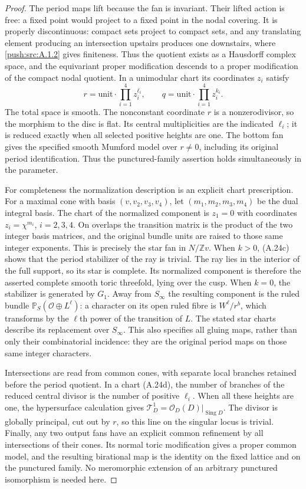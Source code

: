 \begin{proof}
The period maps lift because the fan is invariant. Their
lifted action is free: a fixed point would project to a fixed
point in the nodal covering. It is properly discontinuous:
compact sets project to compact sets, and any translating
element producing an intersection upstairs produces one
downstairs, where \ref{push:src:A.1.2} gives finiteness. Thus the quotient
exists as a Hausdorff complex space, and the equivariant
proper modification descends to a proper modification of
the compact nodal quotient. In a unimodular chart its
coordinates $z_i$ satisfy
\[
 r=\text{unit}\cdot\prod_{i=1}^4 z_i^{\ell_i},
 \qquad q=\text{unit}\cdot\prod_{i=1}^4 z_i^{k_i}.
 \tag{A.24d}
\]
The total space is smooth. The nonconstant coordinate $r$
is a nonzerodivisor, so the morphism to the disc is flat.
Its central multiplicities are the indicated $\ell_i$;
it is reduced exactly when all selected positive heights
are one. The bottom fan gives the specified smooth
Mumford model over $r\ne0$, including its original period
identification. Thus the punctured-family assertion holds
simultaneously in the parameter.

For completeness the normalization description is an
explicit chart prescription. For a maximal cone with basis
$(v,v_2,v_3,v_4)$, let $(m_1,m_2,m_3,m_4)$ be the dual
integral basis. The chart of the normalized component is
$z_1=0$ with coordinates $z_i=\chi^{m_i}$, $i=2,3,4$.
On overlaps the transition matrix is the product of the two
integer basis matrices, and the original bundle units are
raised to those same integer exponents. This is precisely
the star fan in $N/\mathbb Zv$. When $k>0$, (A.24c) shows
that the period stabilizer of the ray is trivial. The ray
lies in the interior of the full support, so its star is
complete. Its normalized component is therefore the
asserted complete smooth toric threefold, lying over the
cusp. When $k=0$, the stabilizer is generated by $G_1$.
Away from $S_\infty$ the resulting component is the ruled
bundle $\mathbb P_S(\mathcal O\oplus L^\ell)$: a character
on its open ruled fibre is $W^\ell/r^b$, which transforms
by the $\ell$th power of the transition of $L$. The stated
star charts describe its replacement over $S_\infty$.
This also specifies all gluing maps, rather than only their
combinatorial incidence: they are the original period maps
on those same integer characters.

Intersections are read from common cones, with separate
local branches retained before the period quotient. In a
chart (A.24d), the number of branches of the reduced
central divisor is the number of positive $\ell_i$.
When all these heights are one, the hypersurface
calculation gives
$\mathcal T^1_D=\mathcal O_D(D)|_{\operatorname{Sing}D}$.
The divisor is globally principal, cut out by $r$, so this
line on the singular locus is trivial. Finally, any two
output fans have an explicit common refinement by all
intersections of their cones. Its normal toric modification
gives a proper common model, and the resulting birational
map is the identity on the fixed lattice and on the
punctured family. No meromorphic extension of an arbitrary
punctured isomorphism is needed here.
\end{proof}

